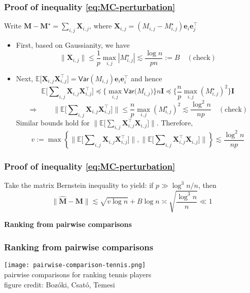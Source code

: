 \documentclass[compress,
mathserif,wide,%
]{beamer}
\begin{document}
\begin{frame}
	\frametitle{Proof of inequality \eqref{eq:MC-perturbation}}

{


Write ${\bm{M}}-\bm{M}^{\star} =\sum_{i,j}\bm{X}_{i,j}$, where $\bm{X}_{i,j}=({M}_{i,j}-M^{\star}_{i,j})\bm{e}_{i}\bm{e}_{j}^{\top}$
\begin{itemize}

\item First, based on Gaussianity, we have
\[
	\|\bm{X}_{i,j}\|\leq\frac{1}{p}\max_{i,j} |M^{\star}_{i,j}| \lesssim\frac{\log n}{pn}:=B \quad (\text{check})
\]


\item Next, $\mathbb{E}\big[\bm{X}_{i,j}\bm{X}_{i,j}^{\top}\big]=\mathsf{Var}({M}_{i,j})\bm{e}_{i}\bm{e}_{i}^{\top}$
and hence
\[
\mathbb{E}\big[\sum\nolimits _{i,j}\bm{X}_{i,j}\bm{X}_{i,j}^{\top}\big]\preceq\Big\{\max_{i,j}\mathsf{Var}\big({M}_{i,j}\big)\Big\} n\bm{I}\preceq\Big\{\frac{n}{p}\max_{i,j}(M^{\star}_{i,j})^{2}\Big\}\bm{I}
\]
\[
\Longrightarrow\qquad\big\|\mathbb{E}\big[\sum\nolimits _{i,j}\bm{X}_{i,j}\bm{X}_{i,j}^{\top}\big]\big\|\leq\frac{n}{p}\max_{i,j}(M^{\star}_{i,j})^{2}\lesssim\frac{\log^{2}n}{np}\quad(\text{check})
\]
Similar bounds hold for $\big\|\mathbb{E}\big[\sum\nolimits _{i,j}\bm{X}_{i,j}^{\top}\bm{X}_{i,j}\big]\big\|$.
Therefore, 
\[
v:=\max\left\{ \big\|\mathbb{E}\big[\sum\nolimits _{i,j}\bm{X}_{i,j}\bm{X}_{i,j}^{\top}\big]\big\|,\big\|\mathbb{E}\big[\sum\nolimits _{i,j}\bm{X}_{i,j}^{\top}\bm{X}_{i,j}\big]\big\|\right\} \lesssim\frac{\log^{2}n}{np}
\]


\end{itemize}



}

\end{frame}

\begin{frame}
	\frametitle{Proof of inequality \eqref{eq:MC-perturbation}}
	Take the matrix Bernstein inequality to yield: if $p\gg\log^{3}n/n$,
then
\[
\|\hat{\bm{M}}-\bm{M}\|\lesssim\sqrt{v\log n}+B\log n \asymp \sqrt{\frac{\log^{3} n }{n}}\ll1
\]
\end{frame}


\begin{frame}[plain]
	\vfill
	\centering
	\large \bf Ranking from pairwise comparisons
	\vfill
\end{frame}



\begin{frame}
	\frametitle{Ranking from pairwise comparisons}


	\begin{center}
		\texttt{[image: pairwise-comparison-tennis.png]} \\
		 pairwise comparisons for ranking tennis players  \\
		\hfill {\footnotesize figure credit: Boz\'{o}ki, Csat\'{o}, Temesi}
	\end{center}

\end{frame}
\end{document}
